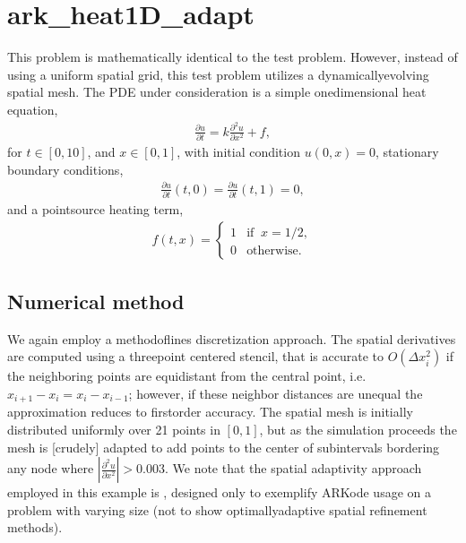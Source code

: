 \documentclass[letterpaper,10pt,english]{sphinxmanual}
\begin{document}
\section{ark\_heat1D\_adapt}
\label{\detokenize{c_serial:ark-heat1d-adapt}}\label{\detokenize{c_serial:id28}}
\sphinxAtStartPar
This problem is mathematically identical to the {\hyperref[\detokenize{c_serial:ark-heat1d}]{}} test
problem.  However, instead of using a uniform spatial grid, this test
problem utilizes a dynamically\sphinxhyphen{}evolving spatial mesh.  The PDE under
consideration is a simple one\sphinxhyphen{}dimensional heat equation,
\begin{equation*}
\begin{split}\frac{\partial u}{\partial t} = k \frac{\partial^2 u}{\partial x^2} + f,\end{split}
\end{equation*}
\sphinxAtStartPar
for \(t \in [0, 10]\), and \(x \in [0, 1]\), with initial
condition \(u(0,x) = 0\), stationary boundary conditions,
\begin{equation*}
\begin{split}\frac{\partial u}{\partial t}(t,0) = \frac{\partial u}{\partial t}(t,1) = 0,\end{split}
\end{equation*}
\sphinxAtStartPar
and a point\sphinxhyphen{}source heating term,
\begin{equation*}
\begin{split}f(t,x) = \begin{cases} 1 & \text{if}\;\; x=1/2, \\
                       0 & \text{otherwise}. \end{cases}\end{split}
\end{equation*}

\subsection{Numerical method}
\label{\detokenize{c_serial:id29}}
\sphinxAtStartPar
We again employ a method\sphinxhyphen{}of\sphinxhyphen{}lines discretization approach.  The
spatial derivatives are computed using a three\sphinxhyphen{}point centered stencil,
that is accurate to \(O(\Delta x_i^2)\) if the neighboring points are
equidistant from the central point, i.e. \(x_{i+1} - x_i = x_i -
x_{i-1}\); however, if these neighbor distances are unequal the
approximation reduces to first\sphinxhyphen{}order accuracy.  The spatial mesh is
initially distributed uniformly over 21 points in \([0,1]\), but
as the simulation proceeds the mesh is {[}crudely{]} adapted to add points
to the center of subintervals bordering any node where
\(\left|\frac{\partial^2 u}{\partial x^2}\right| > 0.003\).
We note that the spatial adaptivity approach employed in this example
is , designed only to exemplify ARKode usage on a problem with
varying size (not to show optimally\sphinxhyphen{}adaptive spatial refinement
methods).
\end{document}
